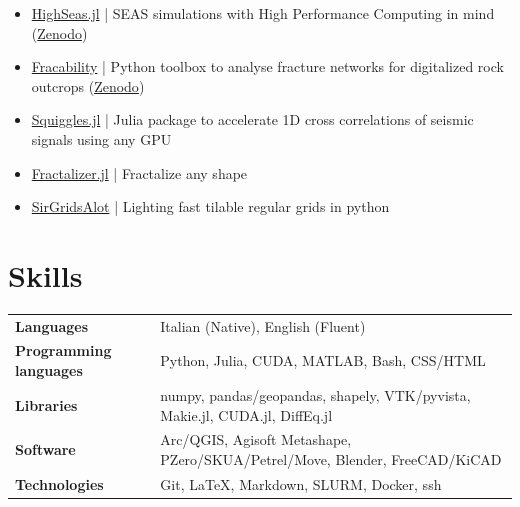\documentclass[a4paper,12pt]{article}
\begin{document}
\begin{itemize}

    \item \href{https://github.com/gbene/HighSeas.jl}{HighSeas.jl} | SEAS simulations with High Performance Computing in mind (\href{https://doi.org/10.5281/zenodo.19372420}{Zenodo})
    \item \href{https://github.com/gecos-lab/FracAbility}{Fracability} | Python toolbox to analyse fracture networks for digitalized rock outcrops (\href{https://doi.org/10.5281/zenodo.14893964}{Zenodo})
    \item \href{https://github.com/gbene/Squiggles.jl}{Squiggles.jl} | Julia package to accelerate 1D cross correlations of seismic signals using any GPU
    \item \href{https://github.com/gbene/Fractalizer.jl}{Fractalizer.jl} | Fractalize any shape
    \item \href{https://github.com/gbene/SirGridsAlot}{SirGridsAlot} | Lighting fast tilable regular grids in python 
\end{itemize}


\section{Skills}
\begin{tabularx}{\linewidth}{@{}l X@{}}
\textbf{Languages} & Italian (Native), English (Fluent)\\
\textbf{Programming languages}  &  Python, Julia, CUDA, MATLAB, Bash, CSS/HTML\\
\textbf{Libraries} & numpy, pandas/geopandas, shapely, VTK/pyvista, Makie.jl, CUDA.jl, DiffEq.jl\\
\textbf{Software} & Arc/QGIS, Agisoft Metashape, PZero/SKUA/Petrel/Move, Blender, FreeCAD/KiCAD\\
\textbf{Technologies} & Git, \LaTeX, Markdown, SLURM, Docker, ssh\\
\end{tabularx}
\end{document}
